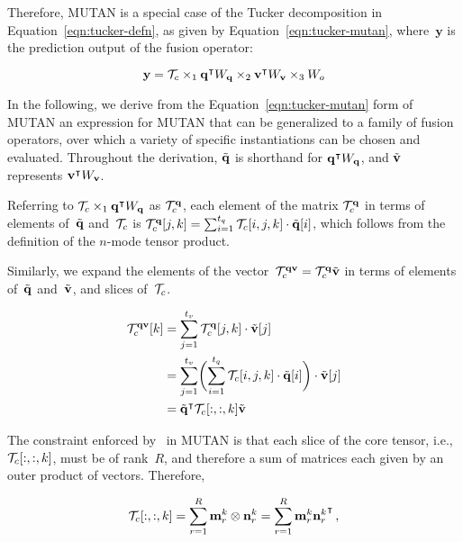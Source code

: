 Therefore, MUTAN is a special case of the Tucker decomposition in
Equation~\ref{eqn:tucker-defn}, as given by Equation~\ref{eqn:tucker-mutan},
where~$\mathbf{y}$ is the prediction output of the fusion operator:

\begin{equation}
        \mathbf{y} = \mathcal{T}_c \times_1
                \mathbf{q}^\intercal{} W_{\mathbf{q}}{} \times_2
                \mathbf{v}^\intercal{} W_{\mathbf{v}}{} \times_3
                W_o
        \label{eqn:tucker-mutan}
\end{equation}

In the following, we derive from the Equation~\ref{eqn:tucker-mutan} form of
MUTAN an expression for MUTAN that can be generalized to a family of fusion
operators, over which a variety of specific instantiations can be chosen and
evaluated.  Throughout the derivation, $\tilde{\mathbf{q}}$ is shorthand for
$\mathbf{q}^\intercal{} W_{\mathbf{q}}{}$, and $\tilde{\mathbf{v}}$ represents $\mathbf{v}^\intercal{} W_{\mathbf{v}}{}$.

Referring to $\mathcal{T}_c \times_1 \mathbf{q}^\intercal{} W_{\mathbf{q}}{}$ as $\mathcal{T}_c^{\mathbf{q}}$, each element of
the matrix $\mathcal{T}_c^{\mathbf{q}}$ in terms of elements of~$\tilde{\mathbf{q}}$ and~$\mathcal{T}_c$ is
$\mathcal{T}_c^{\mathbf{q}}[j, k] = \sum_{i = 1}^{t_q} \mathcal{T}_c[i, j, k] \cdot \tilde{\mathbf{q}}[i]$,
which follows from the definition of the $n$-mode tensor product.

Similarly, we expand the elements of the
vector~$\mathcal{T}_c^{\mathbf{q}\mathbf{v}} = \mathcal{T}_c^{\mathbf{q}} \tilde{\mathbf{v}}$ in terms of elements
of~$\tilde{\mathbf{q}}$ and~$\tilde{\mathbf{v}}$, and slices of~$\mathcal{T}_c$.

\begin{align}
\begin{split}
        \mathcal{T}_c^{\mathbf{q}\mathbf{v}}[k] &= \sum_{j = 1}^{t_v} \mathcal{T}_c^{\mathbf{q}}[j, k] \cdot \tilde{\mathbf{v}}[j]  \\
                       &= \sum_{j = 1}^{t_v} \biggl(\sum_{i = 1}^{t_q} \mathcal{T}_c[i, j, k] \cdot \tilde{\mathbf{q}}[i]\biggr) \cdot \tilde{\mathbf{v}}[j]  \\
                       &= {\tilde{\mathbf{q}}}^\intercal \mathcal{T}_c[:, :, k] \tilde{\mathbf{v}}
\end{split}
\label{eqn:tucker-core-tensor-expanded}
\end{align}

The constraint enforced by~\cite{ben2017mutan} in MUTAN is that each slice of
the core tensor, i.e.,~$\mathcal{T}_c[:, :, k]$, must be of rank~$R$, and therefore a sum
of matrices each given by an outer product of vectors. Therefore,

\begin{equation}
        \mathcal{T}_c[:, :, k] = \sum_{r = 1}^R \mathbf{m}_r^k \otimes \mathbf{n}_r^k
                      = \sum_{r = 1}^R \mathbf{m}_r^k {\mathbf{n}_r^k}^\intercal \,,
\label{eqn:tucker-core-tensor-rank-r}
\end{equation}

